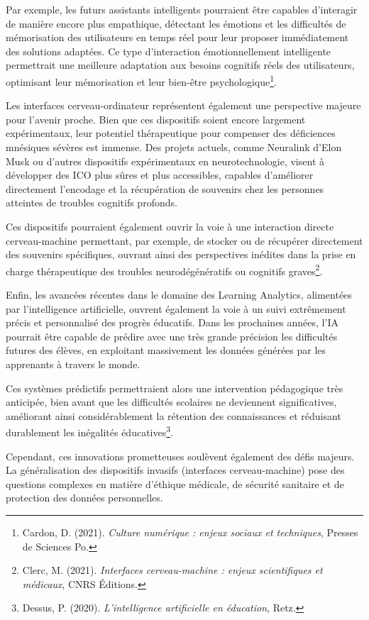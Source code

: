 \documentclass[12pt,a4paper]{report}
\begin{document}
Par exemple, les futurs assistants intelligents pourraient être capables d’interagir de manière encore plus empathique, détectant les émotions et les difficultés de mémorisation des utilisateurs en temps réel pour leur proposer immédiatement des solutions adaptées. Ce type d’interaction émotionnellement intelligente permettrait une meilleure adaptation aux besoins cognitifs réels des utilisateurs, optimisant leur mémorisation et leur bien-être psychologique\footnote{Cardon, D. (2021). \textit{Culture numérique : enjeux sociaux et techniques}, Presses de Sciences Po.}.

Les interfaces cerveau-ordinateur représentent également une perspective majeure pour l’avenir proche. Bien que ces dispositifs soient encore largement expérimentaux, leur potentiel thérapeutique pour compenser des déficiences mnésiques sévères est immense. Des projets actuels, comme Neuralink d’Elon Musk ou d’autres dispositifs expérimentaux en neurotechnologie, visent à développer des ICO plus sûres et plus accessibles, capables d’améliorer directement l’encodage et la récupération de souvenirs chez les personnes atteintes de troubles cognitifs profonds.

Ces dispositifs pourraient également ouvrir la voie à une interaction directe cerveau-machine permettant, par exemple, de stocker ou de récupérer directement des souvenirs spécifiques, ouvrant ainsi des perspectives inédites dans la prise en charge thérapeutique des troubles neurodégénératifs ou cognitifs graves\footnote{Clerc, M. (2021). \textit{Interfaces cerveau-machine : enjeux scientifiques et médicaux}, CNRS Éditions.}.

Enfin, les avancées récentes dans le domaine des Learning Analytics, alimentées par l’intelligence artificielle, ouvrent également la voie à un suivi extrêmement précis et personnalisé des progrès éducatifs. Dans les prochaines années, l’IA pourrait être capable de prédire avec une très grande précision les difficultés futures des élèves, en exploitant massivement les données générées par les apprenants à travers le monde.

Ces systèmes prédictifs permettraient alors une intervention pédagogique très anticipée, bien avant que les difficultés scolaires ne deviennent significatives, améliorant ainsi considérablement la rétention des connaissances et réduisant durablement les inégalités éducatives\footnote{Dessus, P. (2020). \textit{L’intelligence artificielle en éducation}, Retz.}.

Cependant, ces innovations prometteuses soulèvent également des défis majeurs. La généralisation des dispositifs invasifs (interfaces cerveau-machine) pose des questions complexes en matière d’éthique médicale, de sécurité sanitaire et de protection des données personnelles.
\end{document}
